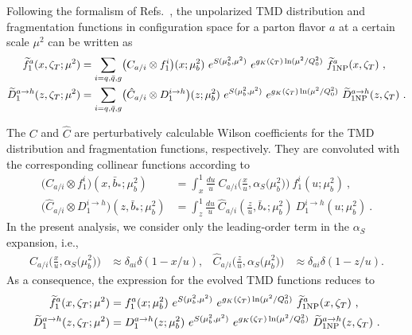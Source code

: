 \documentclass[aps,preprintnumbers,showpacs,nofootinbib,superscriptaddress,floatfix]{revtex4}
\newcommand{\bT}{\zeta_T}
\begin{document}
Following the formalism of Refs.~\cite{Collins:2011zzd,Aybat:2011zv}, the
unpolarized TMD distribution and fragmentation functions in configuration
space for a parton flavor $a$ at a certain scale $\mu^2$ can be written as 
\begin{align}   
\widetilde{f}_1^a (x,  \bT; \mu^2) &= \sum_{i=q,\bar q,g} \bigl( C_{a/i} \otimes f_1^i \bigr) (x; \mu_b^2) 
\  e^{S (\mu_b^2, \mu^2)} \  e^{g_K(\bT) \ln (\mu^2 / Q_0^2)} \  \widetilde{f}_{1 {\rm NP}}^a (x, \bT) \ ,
\label{e:TMDevol1} \\
\widetilde{D}_1^{a\to h} (z, \bT; \mu^2) &= \sum_{i=q,\bar q,g} \bigl( \hat{C}_{a/i} \otimes D_1^{i\to h} \bigr) (z; \mu_b^2) \  e^{S (\mu_b^2, \mu^2)} \  e^{g_K( \bT) \ln (\mu^2 / Q_0^2)} \  \widetilde{D}_{1 {\rm NP}}^{a\to h} (z, \bT) \  .
\label{e:TMDevol2}
\end{align}

The $C$ and $\hat{C}$ are perturbatively calculable Wilson coefficients for
the TMD distribution and fragmentation functions, respectively. They are
convoluted with the corresponding collinear functions according to 
\begin{align}
\bigl( C_{a/i} \otimes f_1^i \bigr) (x, \bar{b}_{\ast}; \mu_b^2) &=
  \int_x^1 \frac{du}{u}\  
        C_{a/i} \Big( \frac{x}{u}, \alpha_S\big(\mu_b^2\big)  \Big) \  
        f_1^i (u; \mu_b^2) \  , 
\label{e:WC1} \\
\bigl( \hat{C}_{a/i} \otimes D_1^{i\to h} \bigr) (z, \bar{b}_{\ast}; \mu_b^2) &= \int_z^1 \frac{du}{u}\  \hat{C}_{a/i} \left( \frac{z}{u}, \bar{b}_{\ast}; \mu_b^2 \right) \  D_1^{i\to h} (u; \mu_b^2) \  . 
\label{e:WC2}
\end{align}
In the present analysis, we consider only the leading-order term
in the $\alpha_S$ expansion, i.e., 
\begin{align} 
C_{a/i} \Big( \frac{x}{u}, \alpha_S\big(\mu_b^2\big)  \Big) &\approx
\delta_{ai} \delta(1-x/u),
&
\hat{C}_{a/i} \Big( \frac{z}{u}, \alpha_S\big(\mu_b^2\big)  \Big) &\approx
\delta_{ai} \delta(1-z/u).
\end{align}  
As a consequence, the expression for the evolved TMD functions reduces to
\begin{align}   
\widetilde{f}_1^a (x,  \bT; \mu^2) &= f_1^a (x ; \mu_b^2) 
\  e^{S (\mu_b^2, \mu^2)} \  e^{g_K(\bT) \ln (\mu^2 / Q_0^2)} \  \widetilde{f}_{1 {\rm NP}}^a (x, \bT) \ ,
\label{e:TMDevol1} \\
\widetilde{D}_1^{a\to h} (z, \bT; \mu^2) &= D_1^{a\to h} (z; \mu_b^2) \  e^{S (\mu_b^2, \mu^2)} \  e^{g_K( \bT) \ln (\mu^2 / Q_0^2)} \  \widetilde{D}_{1 {\rm NP}}^{a\to h} (z, \bT) \  .
\label{e:TMDevol2}
\end{align}
\end{document}
